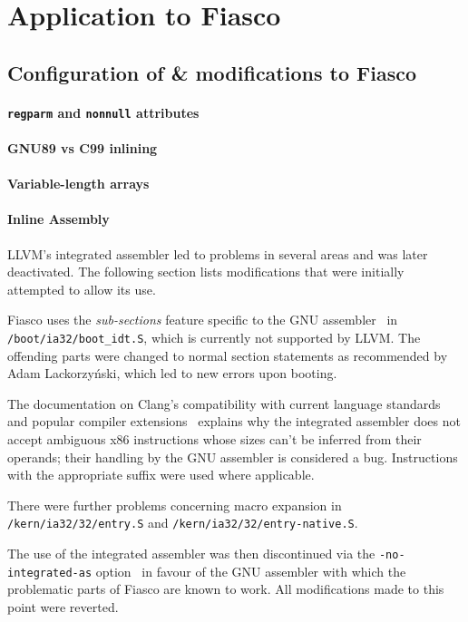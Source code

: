 \section{Application to Fiasco}

\subsection{Configuration of \& modifications to Fiasco}

\paragraph{\texttt{regparm} and \texttt{nonnull} attributes}


\paragraph{GNU89 vs C99 inlining}


\paragraph{Variable-length arrays}


\paragraph{Inline Assembly}

LLVM's integrated assembler led to problems in several areas and was later
deactivated. The following section lists modifications that were initially
attempted to allow its use.

Fiasco uses the \emph{sub-sections} feature specific to the GNU
assembler~\cite{gas-subsections} in \texttt{/boot\-/ia32\-/boot\_idt.S}, which
is currently not supported by LLVM. The offending parts were changed to normal
section statements as recommended by Adam
Lackorzyński, which led to new errors upon booting.

The documentation on Clang's compatibility with current language standards and
popular compiler extensions~\cite[Inline assembly]{clang-compatibility}
explains why the integrated assembler does not accept ambiguous x86
instructions whose sizes can't be inferred from their operands; their handling
by the GNU assembler is considered a bug. Instructions with the appropriate
suffix were used where applicable.

There were further problems concerning macro expansion in
\texttt{/kern/ia32/32\-/en\-try.S} and \texttt{/kern/ia32/32\-/entry-native.S}.

The use of the integrated assembler was then discontinued via the
\texttt{-no-integrated-as} option~\cite{manclang} in favour of the GNU
assembler with which the problematic parts of Fiasco are known to work.
All modifications made to this point were reverted.
